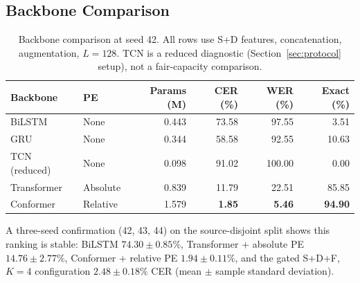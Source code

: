 \documentclass[runningheads]{llncs}
\begin{document}
\subsection{Backbone Comparison}
\begin{table}[htbp]
\centering
\caption{Backbone comparison at seed 42. All rows use S+D features, concatenation, augmentation, $L=128$. TCN is a reduced diagnostic (Section~\ref{sec:protocol} setup), not a fair-capacity comparison.}
\label{tab:backbone}
\begin{tabular}{llrrrr}
\toprule
Backbone & PE & Params (M) & CER (\%) & WER (\%) & Exact (\%)\\
\midrule
BiLSTM & None & 0.443 & 73.58 & 97.55 & 3.51\\
GRU & None & 0.344 & 58.58 & 92.55 & 10.63\\
TCN (reduced) & None & 0.098 & 91.02 & 100.00 & 0.00\\
Transformer & Absolute & 0.839 & 11.79 & 22.51 & 85.85\\
Conformer & Relative & 1.579 & \textbf{1.85} & \textbf{5.46} & \textbf{94.90}\\
\bottomrule
\end{tabular}
\end{table}

A three-seed confirmation (42, 43, 44) on the source-disjoint split shows this ranking is stable: BiLSTM $74.30\pm0.85\%$, Transformer + absolute PE $14.76\pm2.77\%$, Conformer + relative PE $1.94\pm0.11\%$, and the gated S+D+F, $K=4$ configuration $2.48\pm0.18\%$ CER (mean $\pm$ sample standard deviation).
\end{document}
